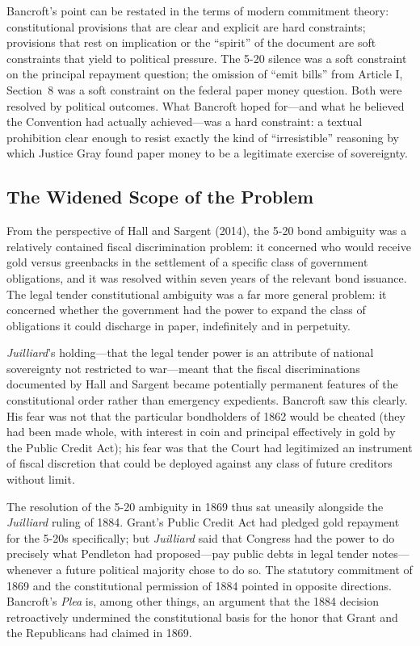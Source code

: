 \documentclass[12pt]{article}
\begin{document}
Bancroft's point can be restated in the terms of modern commitment theory:
constitutional provisions that are clear and explicit are hard constraints;
provisions that rest on implication or the ``spirit'' of the document are
soft constraints that yield to political pressure. The 5-20 silence was
a soft constraint on the principal repayment question; the omission of
``emit bills'' from Article I, Section~8 was a soft constraint on the
federal paper money question. Both were resolved by political outcomes.
What Bancroft hoped for---and what he believed the Convention had
actually achieved---was a hard constraint: a textual prohibition clear
enough to resist exactly the kind of ``irresistible'' reasoning by
which Justice Gray found paper money to be a legitimate exercise of
sovereignty.

\subsection{The Widened Scope of the Problem}

From the perspective of Hall and Sargent (2014), the 5-20 bond ambiguity
was a relatively contained fiscal discrimination problem: it concerned
who would receive gold versus greenbacks in the settlement of a specific
class of government obligations, and it was resolved within seven years
of the relevant bond issuance. The legal tender constitutional ambiguity
was a far more general problem: it concerned whether the government had
the power to expand the class of obligations it could discharge in
paper, indefinitely and in perpetuity.

\textit{Juilliard}'s holding---that the legal tender power is an
attribute of national sovereignty not restricted to war---meant that the
fiscal discriminations documented by Hall and Sargent became potentially
permanent features of the constitutional order rather than emergency
expedients. Bancroft saw this clearly. His fear was not that the
particular bondholders of 1862 would be cheated (they had been made
whole, with interest in coin and principal effectively in gold by the
Public Credit Act); his fear was that the Court had legitimized an
instrument of fiscal discretion that could be deployed against any class
of future creditors without limit.

The resolution of the 5-20 ambiguity in 1869 thus sat uneasily alongside
the \textit{Juilliard} ruling of 1884. Grant's Public Credit Act had
pledged gold repayment for the 5-20s specifically; but \textit{Juilliard}
said that Congress had the power to do precisely what Pendleton had
proposed---pay public debts in legal tender notes---whenever a future
political majority chose to do so. The statutory commitment of 1869 and
the constitutional permission of 1884 pointed in opposite directions.
Bancroft's \textit{Plea} is, among other things, an argument that the
1884 decision retroactively undermined the constitutional basis for the
honor that Grant and the Republicans had claimed in 1869.
\end{document}
